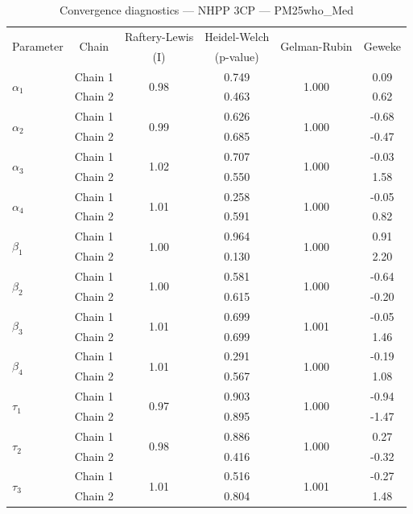 \begin{table}[H]
\centering
\caption{Convergence diagnostics — NHPP 3CP — PM25who_Med}
\begin{tabular}{lccccc}
\toprule
\multirow{2}{*}{Parameter} & \multirow{2}{*}{Chain} & Raftery-Lewis & Heidel-Welch & \multirow{2}{*}{Gelman-Rubin} & \multirow{2}{*}{Geweke} \\
 & & (I) & (p-value) & & (z) \\
\midrule
\multirow{2}{*}{$\alpha_1$} & Chain 1 & \multirow{2}{*}{0.98} & 0.749 & \multirow{2}{*}{1.000} & 0.09 \\
 & Chain 2 & & 0.463 & & 0.62 \\
\multirow{2}{*}{$\alpha_2$} & Chain 1 & \multirow{2}{*}{0.99} & 0.626 & \multirow{2}{*}{1.000} & -0.68 \\
 & Chain 2 & & 0.685 & & -0.47 \\
\multirow{2}{*}{$\alpha_3$} & Chain 1 & \multirow{2}{*}{1.02} & 0.707 & \multirow{2}{*}{1.000} & -0.03 \\
 & Chain 2 & & 0.550 & & 1.58 \\
\multirow{2}{*}{$\alpha_4$} & Chain 1 & \multirow{2}{*}{1.01} & 0.258 & \multirow{2}{*}{1.000} & -0.05 \\
 & Chain 2 & & 0.591 & & 0.82 \\
\midrule
\multirow{2}{*}{$\beta_1$} & Chain 1 & \multirow{2}{*}{1.00} & 0.964 & \multirow{2}{*}{1.000} & 0.91 \\
 & Chain 2 & & 0.130 & & 2.20 \\
\multirow{2}{*}{$\beta_2$} & Chain 1 & \multirow{2}{*}{1.00} & 0.581 & \multirow{2}{*}{1.000} & -0.64 \\
 & Chain 2 & & 0.615 & & -0.20 \\
\multirow{2}{*}{$\beta_3$} & Chain 1 & \multirow{2}{*}{1.01} & 0.699 & \multirow{2}{*}{1.001} & -0.05 \\
 & Chain 2 & & 0.699 & & 1.46 \\
\multirow{2}{*}{$\beta_4$} & Chain 1 & \multirow{2}{*}{1.01} & 0.291 & \multirow{2}{*}{1.000} & -0.19 \\
 & Chain 2 & & 0.567 & & 1.08 \\
\midrule
\multirow{2}{*}{$\tau_1$} & Chain 1 & \multirow{2}{*}{0.97} & 0.903 & \multirow{2}{*}{1.000} & -0.94 \\
 & Chain 2 & & 0.895 & & -1.47 \\
\multirow{2}{*}{$\tau_2$} & Chain 1 & \multirow{2}{*}{0.98} & 0.886 & \multirow{2}{*}{1.000} & 0.27 \\
 & Chain 2 & & 0.416 & & -0.32 \\
\multirow{2}{*}{$\tau_3$} & Chain 1 & \multirow{2}{*}{1.01} & 0.516 & \multirow{2}{*}{1.001} & -0.27 \\
 & Chain 2 & & 0.804 & & 1.48 \\
\bottomrule
\end{tabular}
\end{table}
